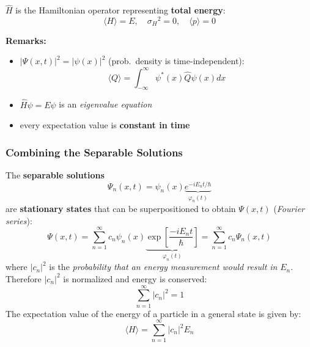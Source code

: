 
$\widehat{H}$ is the Hamiltonian operator representing \textbf{total energy}:
\noindent\begin{equation*}
    \langle H\rangle = E,\quad{\sigma_H}^2 = 0, \quad \langle p\rangle = 0
\end{equation*}

\newpar{}

\textbf{Remarks:}
\begin{itemize}
    \item $|\Psi(x,t)|^2 = |\psi(x)|^2$ (prob.\ density is time-independent):
          \noindent\begin{equation*}
              \langle Q\rangle=\int_{-\infty}^\infty\psi^*(x)\widehat{Q}\psi(x)dx
          \end{equation*}
    \item $\widehat{H}\psi = E\psi$ is an \textit{eigenvalue equation}
    \item every expectation value is \textbf{constant in time}
\end{itemize}

\subsubsection{Combining the Separable Solutions}
The \textbf{separable solutions}
\noindent\begin{equation*}
    \Psi_n(x,t)=\psi_n(x)\underbrace{e^{-iE_n t/\hbar}}_{\varphi_n(t)}
\end{equation*}
are \textbf{stationary states} that can be superpositioned to obtain $\Psi(x,t)$ (\textit{Fourier series}):
\noindent\begin{equation*}
    \Psi(x,t) =\sum_{n=1}^\infty c_n\psi_n(x) \underbrace{\exp\left[\frac{-iE_n t}{\hbar}\right]}_{\varphi_n(t)}=\sum_{n=1}^\infty c_n\Psi_n(x,t)
\end{equation*}
where $|c_n|^2$ is the \textit{probability that an energy measurement would result in} $E_n$. Therefore $|c_n|^2$ is normalized and energy is conserved:
\noindent\begin{equation*}
    \sum_{n=1}^\infty|c_n|^2 =1
\end{equation*}
The expectation value of the energy of a particle in a general state is given by:
\noindent\begin{equation*}
    \langle H\rangle=\sum_{n=1}^\infty|c_n|^2E_n
\end{equation*}

